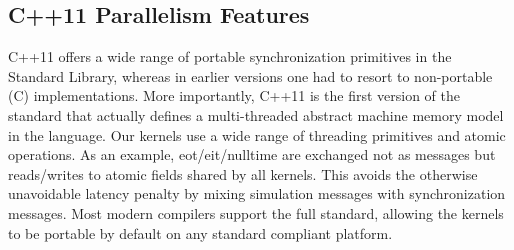 \subsection{C++11 Parallelism Features}
C++11 offers a wide range of portable synchronization primitives in the Standard Library, whereas in earlier versions one had to resort to non-portable (C) implementations. More importantly, C++11 is the first version of the standard that actually defines a multi-threaded abstract machine memory model in the language.
Our kernels use a wide range of threading primitives and atomic operations. As an example, eot/eit/nulltime are exchanged not as messages but reads/writes to atomic fields shared by all kernels. This avoids the otherwise unavoidable latency penalty by mixing simulation messages with synchronization messages. %
Most modern compilers support the full standard, allowing the kernels to be portable by default on any standard compliant platform. %
